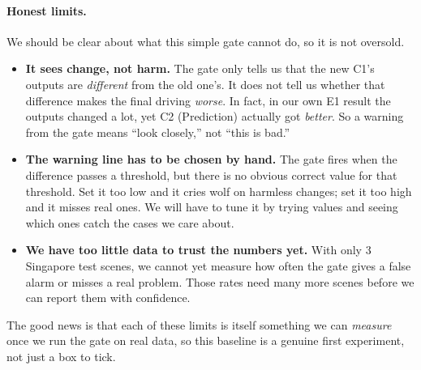 \documentclass[11pt,a4paper]{article}
\begin{document}
\paragraph{Honest limits.} We should be clear about what this simple gate
cannot do, so it is not oversold.
\begin{itemize}[noitemsep]
    \item \textbf{It sees change, not harm.} The gate only tells us that
          the new C1's outputs are \emph{different} from the old one's. It
          does not tell us whether that difference makes the final driving
          \emph{worse}. In fact, in our own E1 result the outputs changed a
          lot, yet C2 (Prediction) actually got \emph{better}. So a warning
          from the gate means ``look closely,'' not ``this is bad.''
    \item \textbf{The warning line has to be chosen by hand.} The gate
          fires when the difference passes a threshold, but there is no
          obvious correct value for that threshold. Set it too low and it
          cries wolf on harmless changes; set it too high and it misses
          real ones. We will have to tune it by trying values and seeing
          which ones catch the cases we care about.
    \item \textbf{We have too little data to trust the numbers yet.} With
          only 3 Singapore test scenes, we cannot yet measure how often the
          gate gives a false alarm or misses a real problem. Those rates
          need many more scenes before we can report them with confidence.
\end{itemize}
The good news is that each of these limits is itself something we can
\emph{measure} once we run the gate on real data, so this baseline is a
genuine first experiment, not just a box to tick.





\end{document}
